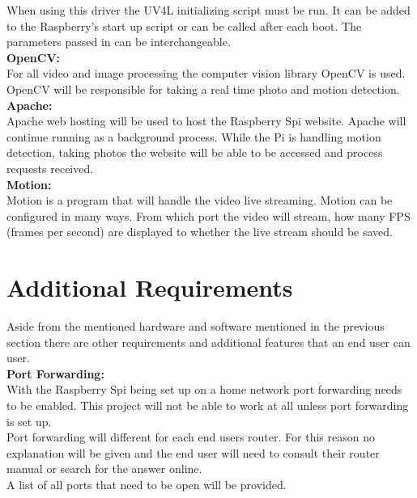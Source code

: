 \documentclass[]{report}
\begin{document}
When using this driver the UV4L initializing script must be run. It can be added to the Raspberry's start up script or can be called after each boot. The parameters passed in can be interchangeable.\\

\noindent
{\bf OpenCV:}\\
\break
For all video and image processing the computer vision library OpenCV is used.\\

OpenCV will be responsible for taking a real time photo and motion detection.\\

\noindent
{\bf Apache:}\\
\break
Apache web hosting will be used to host the Raspberry Spi website. Apache will continue running as a background process. While the Pi is handling motion detection, taking photos the website will be able to be accessed and process requests received.\\ 

\noindent
{\bf Motion:}\\
\break
Motion is a program that will handle the video live streaming. Motion can be configured in many ways. From which port the video will stream, how many FPS (frames per second) are displayed to whether the live stream should be saved.\\

\clearpage
\section{Additional Requirements}	
\label{sec:additional}
Aside from the mentioned hardware and software mentioned in the previous section there are other requirements and additional features that an end user can user.\\

\noindent
{\bf Port Forwarding:}\\
\break
With the Raspberry Spi being set up on a home network port forwarding needs to be enabled. This project will not be able to work at all unless port forwarding is set up.\\

Port forwarding will different for each end users router. For this reason no explanation will be given and the end user will need to consult their router manual or search for the answer online. \\

A list of all ports that need to be open will be provided. \\
\end{document}
